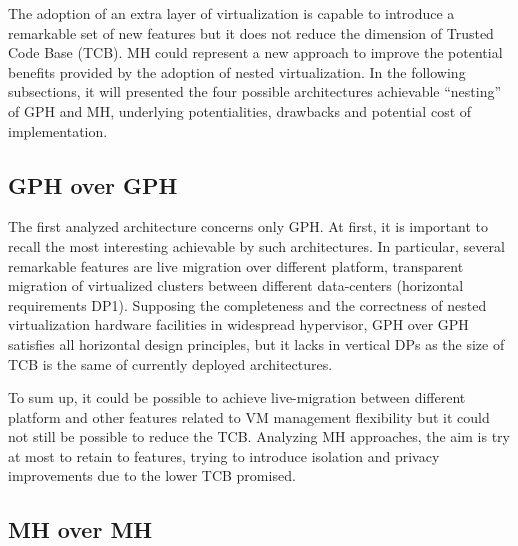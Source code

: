 \documentclass{sig-alternate}
\begin{document}
The adoption of an extra layer of virtualization is capable to introduce a remarkable set of new features but it does not reduce the dimension of Trusted Code Base (TCB).
MH could represent a new approach to improve the potential benefits provided by the adoption of nested virtualization. In the following subsections, it will presented the four possible architectures achievable ``nesting'' of GPH and MH, underlying potentialities, drawbacks and potential cost of implementation.

\subsection{GPH over GPH}

The first analyzed architecture concerns only GPH. At first, it is important to recall the most interesting achievable by such architectures. In particular, several remarkable features are live migration over different platform, transparent migration of virtualized clusters between different data-centers (horizontal requirements DP1).
Supposing the completeness and the correctness of nested virtualization hardware facilities in widespread hypervisor, GPH over GPH satisfies all horizontal design principles, but it lacks in vertical DPs as the size of TCB is the same of currently deployed architectures.

To sum up, it could be possible to achieve live-migration between different platform and other features related to VM management flexibility but it could not still be possible to reduce the TCB. Analyzing MH approaches, the aim is try at most to retain to features, trying to introduce isolation and privacy improvements due to the lower TCB promised.


\subsection{MH over MH}
\end{document}
